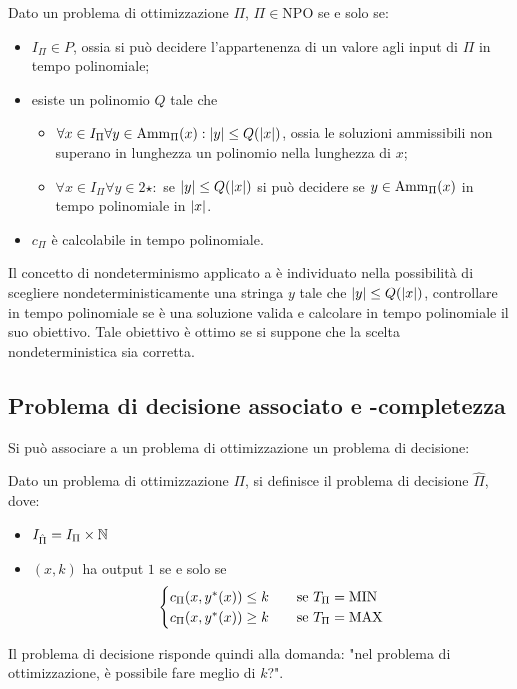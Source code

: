 \begin{defin}[\NPO]
	Dato un problema di ottimizzazione $\Pi$, $\Pi\in\text{NPO}$ se e solo se:
	\begin{itemize}
		\item $I_\Pi\in P$, ossia si può decidere l'appartenenza di un valore agli input di $\Pi$ in tempo polinomiale;
		\item esiste un polinomio $Q$ tale che
		      \begin{itemize}
			      \item $\forall x\in I_\Pi \forall y\in\mathrm{Amm}_\Pi(x): |y|\leq Q(|x|)$, ossia le soluzioni ammissibili non superano in lunghezza un polinomio nella lunghezza di $x$;
			      \item $\forall x\in I_\Pi \forall y\in 2\star:$ se $|y|\leq Q(|x|)$ si può decidere se $y\in\mathrm{Amm}_\Pi(x)$ in tempo polinomiale in $|x|$.
		      \end{itemize}
		\item $c_\Pi$ è calcolabile in tempo polinomiale.
	\end{itemize}
\end{defin}
Il concetto di nondeterminismo applicato a \NPO è individuato nella possibilità di scegliere nondeterministicamente una stringa $y$ tale che $|y|\leq Q(|x|)$, controllare in tempo polinomiale se è una soluzione valida e calcolare in tempo polinomiale il suo obiettivo. Tale obiettivo è ottimo se si suppone che la scelta nondeterministica sia corretta.


\subsection{Problema di decisione associato e \texorpdfstring{\NPO}{NPO}-completezza}
Si può associare a un problema di ottimizzazione un problema di decisione:
\begin{defin}
	Dato un problema di ottimizzazione $\Pi$, si definisce il problema di decisione $\hat\Pi$, dove:
	\begin{itemize}
		\item $I_{\hat\Pi}=I_\Pi\times\mathbb N$
		\item $(x,k)$ ha output $1$ se e solo se
		      \begin{equation*}
			      \begin{cases}
				      c_\Pi(x,y^*(x))\leq k \quad & \text{se } T_\Pi=\mathrm{MIN} \\
				      c_\Pi(x,y^*(x))\geq k \quad & \text{se } T_\Pi=\mathrm{MAX}
			      \end{cases}
		      \end{equation*}
	\end{itemize}
\end{defin}
Il problema di decisione risponde quindi alla domanda: "nel problema di ottimizzazione, è possibile fare meglio di $k$?".

